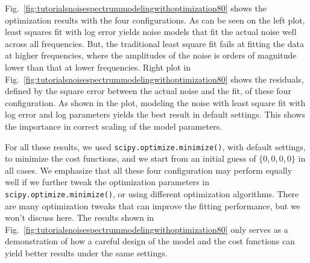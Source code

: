 Fig.~\ref{fig:tutorialsnoisespectrummodelingwithoptimization80} shows the optimization results with the four configurations.
As can be seen on the left plot, least squares fit with log error yields noise models that fit the actual noise well across all frequencies.
But, the traditional least square fit fails at fitting the data at higher frequencies, where the amplitudes of the noise is orders of magnitude lower than that at lower frequencies.
Right plot in Fig.~\ref{fig:tutorialsnoisespectrummodelingwithoptimization80} shows the residuals, defined by the square error between the actual noise and the fit, of these four configuration.
As shown in the plot, modeling the noise with least square fit with log error and log parameters yields the best result in default settings.
This shows the importance in correct scaling of the model parameters.

For all these results, we used \verb|scipy.optimize.minimize()|, with default settings, to minimize the cost functions, and we start from an initial guess of $\{0, 0, 0, 0\}$ in all cases.
We emphasize that all these four configuration may perform equally well if we further tweak the optimization parameters in \verb|scipy.optimize.minimize()|, or using different optimization algorithms.
There are many optimization tweaks that can improve the fitting performance, but we won't discuss here.
The results shown in Fig.~\ref{fig:tutorialsnoisespectrummodelingwithoptimization80} only serves as a demonstration of how a careful design of the model and the cost functions can yield better results under the same settings.
